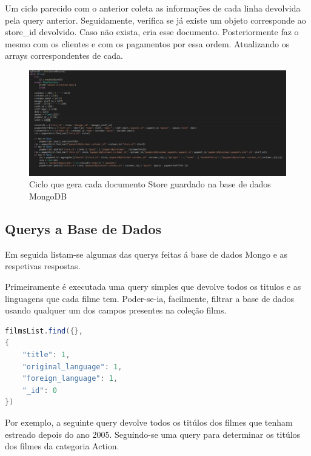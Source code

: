  
\par Um ciclo parecido com o anterior coleta as informações de cada linha devolvida pela query anterior. Seguidamente, verifica se já existe um objeto corresponde ao store\_id devolvido. Caso não exista, cria esse documento. Posteriormente faz o mesmo com os clientes e com os pagamentos por essa ordem. Atualizando os arrays correspondentes de cada.

\begin{figure}[H]

  \centering

  \includegraphics[width=\textwidth]{PovoamentoMongo2.png}

  \caption {Ciclo que gera cada documento Store guardado na base de dados MongoDB}

  \label {fig:Mongo2}

\end{figure}


\subsection{Querys a Base de Dados}

Em seguida listam-se algumas das querys feitas á base de dados Mongo e as respetivas respostas.
\par Primeiramente é executada uma query simples que devolve todos os titulos e as linguagens que cada filme tem. Poder-se-ia, facilmente, filtrar a base de dados usando qualquer um dos campos presentes na coleção films.

\begin{lstlisting}[language=java,caption=Query ao Mongo para devolver todos os Filmes]
filmsList.find({},
{
	"title": 1, 
	"original_language": 1, 
	"foreign_language": 1,
	"_id": 0
})
\end{lstlisting}

Por exemplo, a seguinte query devolve todos os titúlos dos filmes que tenham estreado depois do ano 2005. Seguindo-se uma query para determinar os titúlos dos filmes da categoria Action.

